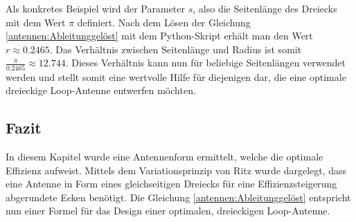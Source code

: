 Als konkretes Beispiel wird der Parameter $s$, also die Seitenlänge des Dreiecks mit dem Wert $\pi$ definiert. 
Nach dem Lösen der Gleichung \eqref{antennen:Ableitunggelöst} mit dem Python-Skript \cite{antennen:codeAbleitung} erhält
man den Wert $r\approx0.2465$. Das Verhältnis zwischen Seitenlänge und Radius ist somit $\frac{\pi}{0.2465} \approx 12.744$.
Dieses Verhältnis kann nun für beliebige Seitenlängen verwendet werden und stellt somit eine wertvolle Hilfe für 
diejenigen dar, die eine optimale dreieckige Loop-Antenne entwerfen möchten.

\subsection{Fazit\label{antennen:fazit}}
In diesem Kapitel wurde eine Antennenform ermittelt, welche die optimale Effizienz aufweist. Mittels dem Variationsprinzip von Ritz wurde dargelegt, dass eine Antenne in Form eines gleichseitigen Dreiecks für eine Effizienzsteigerung abgerundete Ecken benötigt. Die Gleichung \eqref{antennen:Ableitunggelöst} entspricht nun einer Formel für das Design einer optimalen, dreieckigen Loop-Antenne. 
